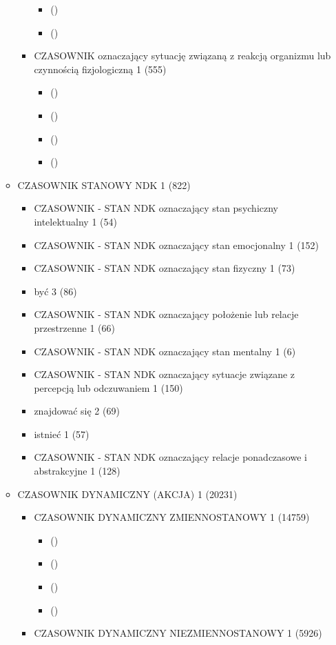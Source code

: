\documentclass[a4paper,12pt]{article}
\begin{document}
\begin{itemize}
\begin{itemize}
\begin{itemize}
\begin{itemize}
      \item   ()
      \item   ()
      \end{itemize}
    \item CZASOWNIK oznaczający sytuację związaną z reakcją organizmu lub czynnością fizjologiczną 1  (555)
      \begin{itemize}
      \item   ()
      \item   ()
      \item   ()
      \item   ()
      \end{itemize}
    \end{itemize}
  \item CZASOWNIK STANOWY NDK 1  (822)
    \begin{itemize}
    \item CZASOWNIK - STAN NDK oznaczający stan psychiczny intelektualny 1  (54)
    \item CZASOWNIK - STAN NDK oznaczający stan emocjonalny 1  (152)
    \item CZASOWNIK - STAN NDK oznaczający stan fizyczny 1  (73)
    \item być 3  (86)
    \item CZASOWNIK - STAN NDK oznaczający położenie lub relacje przestrzenne 1  (66)
    \item CZASOWNIK - STAN NDK oznaczający stan mentalny 1  (6)
    \item CZASOWNIK - STAN NDK oznaczający sytuacje związane z percepcją lub odczuwaniem 1  (150)
    \item znajdować się 2  (69)
    \item istnieć 1  (57)
    \item CZASOWNIK - STAN NDK oznaczający relacje ponadczasowe i abstrakcyjne 1  (128)
    \end{itemize}
  \item CZASOWNIK DYNAMICZNY (AKCJA) 1  (20231)
    \begin{itemize}
    \item CZASOWNIK DYNAMICZNY ZMIENNOSTANOWY 1  (14759)
      \begin{itemize}
      \item   ()
      \item   ()
      \item   ()
      \item   ()
      \end{itemize}
    \item CZASOWNIK DYNAMICZNY NIEZMIENNOSTANOWY 1  (5926)

\end{itemize}
\end{itemize}
\end{itemize}
\end{document}
